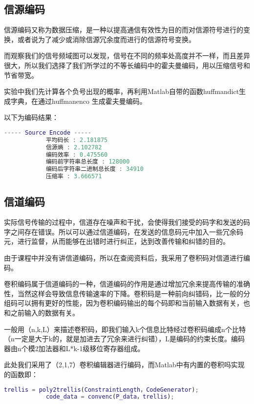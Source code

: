 \documentclass{../source/Experiment}
\begin{document}
        \subsection{信源编码}
            信源编码又称为数据压缩，是一种以提高通信有效性为目的而对信源符号进行的变换，或者说为了减少或消除信源冗余度而进行的信源符号变换。
            
            而观察我们的信号频域图可以发现，信号在不同的频率处高度并不一样，而且差异很大，所以我们选择了我们所学过的不等长编码中的霍夫曼编码，用以压缩信号和节省带宽。

            实验中我们先计算各个负号出现的概率，再利用Matlab自带的函数huffmandict生成字典，在通过huffmanenco 生成霍夫曼编码。

            以下为编码结果：
            \begin{lstlisting}[language = matlab]
            ----- Source Encode -----
            平均码长 : 2.181875
            信源熵 : 2.102782
            编码效率 : 0.475560
            编码前字符串总长度 : 128000
            编码后字符串二进制总长度 : 34910
            压缩率 : 3.666571
            \end{lstlisting}

        \subsection{信道编码}
            实际信号传输的过程中，信道存在噪声和干扰，会使得我们接受的码字和发送的码字之间存在错误。所以可以通过信道编码，在发送的信息码元中加入一些冗余码元，进行监督，从而能够在出错时进行纠正，达到改善传输和纠错的目的。

            由于课程中并没有讲信道编码，所以在查阅资料后，我采用了卷积码对信道进行编码。

            卷积编码属于信道编码的一种，信道编码的作用是通过增加冗余来提高传输的准确性，当然这样会导致信息传输速率的下降。卷积码是一种前向纠错码，比一般的分组码可以拥有更好的性能，因为卷积编码输出的每个码即和当前输入数据有关，也和之前输入的数据有关。

            一般用（n,k,L）来描述卷积码，即我们输入k个信息比特经过卷积码编成n个比特（n一定是大于k的，就是加进去了冗余来进行纠错），L是编码的约束长度。编码器由n个模2加法器和L*k-1级移位寄存器组成。

            此处我们采用了（2,1,7）卷积编辑器进行编码，而Matlab中有内置的卷积吗实现的函数即：
            

            \begin{lstlisting}[language = matlab]
            trellis = poly2trellis(ConstraintLength，CodeGenerator);
            code_data = convenc(P_data，trellis);
            \end{lstlisting}
\end{document}
